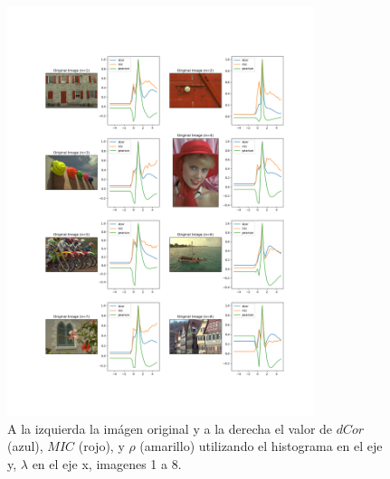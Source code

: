 \begin{figure}
    \centering
    \includegraphics[width=0.8\textwidth]{figuras/hist_comp_1.png}
    \caption{A la izquierda la im\'agen original y a la derecha el valor de $dCor$ (azul), $MIC$ (rojo), y $\rho$ (amarillo) utilizando el histograma en el eje y, $\lambda$ en el eje x, imagenes 1 a 8.}
\end{figure}

